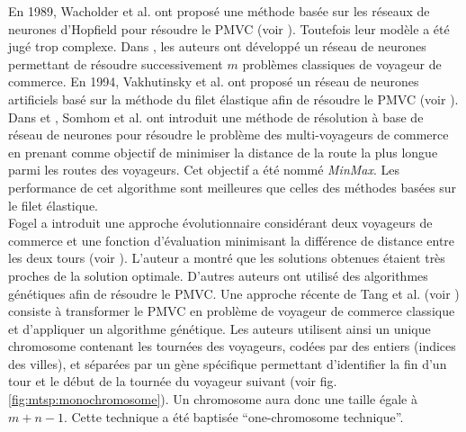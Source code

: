   En 1989, Wacholder et al. ont proposé une méthode basée sur les réseaux de neurones d'Hopfield pour résoudre le PMVC (voir \cite{Wacholder1989}). Toutefois leur modèle a été jugé trop complexe. Dans \cite{Hsu1991}, les auteurs ont développé un réseau de neurones permettant de résoudre successivement $m$ problèmes classiques de voyageur de commerce. En 1994, Vakhutinsky et al. ont proposé un réseau de neurones artificiels basé sur la méthode du filet élastique afin de résoudre le PMVC (voir \cite{Vakhutinsky1994}). Dans \cite{Somhom1999} et \cite{Modares1999}, Somhom et al. ont introduit une méthode de résolution à base de réseau de neurones pour résoudre le problème des multi-voyageurs de commerce en prenant comme objectif de minimiser la distance de la route la plus longue parmi les routes des voyageurs. Cet objectif a été nommé \textit{MinMax}. Les performance de cet algorithme sont meilleures que celles des méthodes basées sur le filet élastique.\\
  
  Fogel a introduit une approche évolutionnaire considérant deux voyageurs de commerce et une fonction d'évaluation minimisant la différence de distance entre les deux tours (voir \cite{Fogel1990}). L'auteur a montré que les solutions obtenues étaient très proches de la solution optimale.
  D'autres auteurs ont utilisé des algorithmes génétiques afin de résoudre le PMVC. Une approche récente de Tang et al. (voir \cite{Tang2000}) consiste à transformer le PMVC en problème de voyageur de commerce classique et d'appliquer un algorithme génétique. Les auteurs utilisent ainsi un unique chromosome contenant les tournées des voyageurs, codées par des entiers (indices des villes), et séparées par un gène spécifique permettant d'identifier la fin d'un tour et le début de la tournée du voyageur suivant (voir fig. \ref{fig:mtsp:monochromosome}). Un chromosome aura donc une taille égale à $m+n-1$. Cette technique a été baptisée ``one-chromosome technique''.
  
